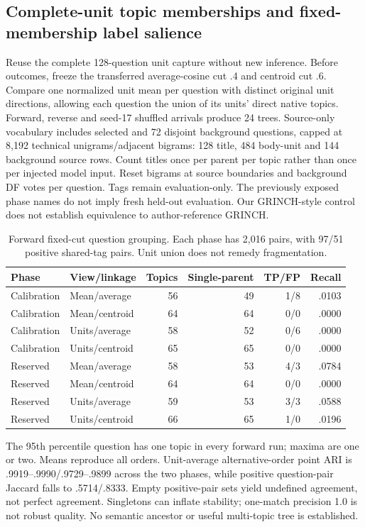 \documentclass[11pt]{article}
\begin{document}
\subsection{Complete-unit topic memberships and fixed-membership label salience}
Reuse the complete 128-question unit capture without new inference. Before
outcomes, freeze the transferred average-cosine cut .4 and centroid cut .6.
Compare one normalized unit mean per question with distinct original unit
directions, allowing each question the union of its units' direct native topics.
Forward, reverse and seed-17 shuffled arrivals produce 24 trees. Source-only
vocabulary includes selected and 72 disjoint background questions, capped at
8,192 technical unigrams/adjacent bigrams: 128 title, 484 body-unit and 144
background source rows. Count titles once per parent per topic rather than once
per injected model input. Reset bigrams at source boundaries and background DF
votes per question. Tags remain evaluation-only. The previously exposed phase
names do not imply fresh held-out evaluation. Our GRINCH-style control does not
establish equivalence to author-reference GRINCH.

\begin{table}[ht]
\centering\small
\begin{tabular}{llrrrr}
\toprule
Phase & View/linkage & Topics & Single-parent & TP/FP & Recall\\
\midrule
Calibration & Mean/average & 56 & 49 & 1/8 & .0103\\
Calibration & Mean/centroid & 64 & 64 & 0/0 & .0000\\
Calibration & Units/average & 58 & 52 & 0/6 & .0000\\
Calibration & Units/centroid & 65 & 65 & 0/0 & .0000\\
Reserved & Mean/average & 58 & 53 & 4/3 & .0784\\
Reserved & Mean/centroid & 64 & 64 & 0/0 & .0000\\
Reserved & Units/average & 59 & 53 & 3/3 & .0588\\
Reserved & Units/centroid & 66 & 65 & 1/0 & .0196\\
\bottomrule
\end{tabular}
\caption{Forward fixed-cut question grouping. Each phase has 2,016 pairs,
with 97/51 positive shared-tag pairs. Unit union does not remedy fragmentation.}
\end{table}

The 95th percentile question has one topic in every forward run; maxima are one
or two. Means reproduce all orders. Unit-average alternative-order point ARI is
.9919--.9990/.9729--.9899 across the two phases, while positive question-pair
Jaccard falls to .5714/.8333. Empty positive-pair sets yield undefined agreement,
not perfect agreement. Singletons can inflate stability; one-match precision
1.0 is not robust quality. No semantic ancestor or useful multi-topic tree is
established.
\end{document}
